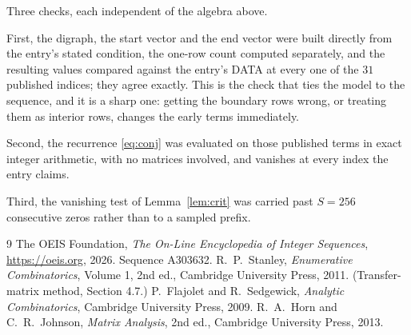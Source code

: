 \documentclass[11pt,a4paper]{article}
\theoremstyle{plain}
\theoremstyle{definition}
\begin{document}
Three checks, each independent of the algebra above.

First, the digraph, the start vector and the end vector were built directly from the
entry's stated condition, the one-row count computed separately, and the resulting values
compared against the entry's DATA at every one of the $31$ published indices; they
agree exactly. This is the check that ties the model to the sequence, and it is a sharp one:
getting the boundary rows wrong, or treating them as interior rows, changes the early terms
immediately.

Second, the recurrence \eqref{eq:conj} was evaluated on those published terms in exact
integer arithmetic, with no matrices involved, and vanishes at every index the entry claims.

Third, the vanishing test of Lemma~\ref{lem:crit} was carried past $S=256$ consecutive
zeros rather than to a sampled prefix.

\begin{thebibliography}{9}
 The OEIS Foundation, \emph{The On-Line Encyclopedia of Integer
Sequences}, \url{https://oeis.org}, 2026. Sequence A303632.
 R.~P.~Stanley, \emph{Enumerative Combinatorics}, Volume 1, 2nd ed.,
Cambridge University Press, 2011. (Transfer-matrix method, Section 4.7.)
 P.~Flajolet and R.~Sedgewick, \emph{Analytic Combinatorics}, Cambridge
University Press, 2009.
 R.~A.~Horn and C.~R.~Johnson, \emph{Matrix Analysis}, 2nd ed., Cambridge
University Press, 2013.
\end{thebibliography}
\end{document}
